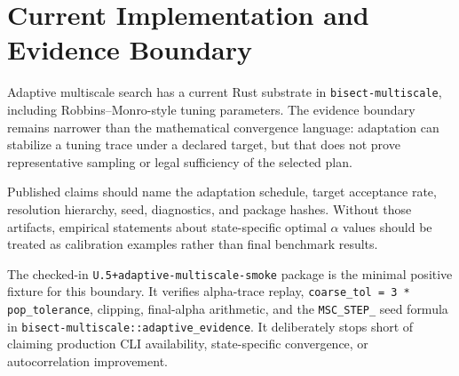 \section{Current Implementation and Evidence Boundary}

Adaptive multiscale search has a current Rust substrate in
\texttt{bisect-multiscale}, including Robbins--Monro-style tuning parameters.
The evidence boundary remains narrower than the mathematical convergence
language: adaptation can stabilize a tuning trace under a declared target, but
that does not prove representative sampling or legal sufficiency of the selected
plan.

Published claims should name the adaptation schedule, target acceptance rate,
resolution hierarchy, seed, diagnostics, and package hashes.  Without those
artifacts, empirical statements about state-specific optimal $\alpha$ values
should be treated as calibration examples rather than final benchmark results.

The checked-in \texttt{U.5+adaptive-multiscale-smoke} package is the minimal
positive fixture for this boundary.  It verifies alpha-trace replay,
\texttt{coarse\_tol = 3 * pop\_tolerance}, clipping, final-alpha arithmetic, and
the \texttt{MSC\_STEP\_} seed formula in
\texttt{bisect-multiscale::adaptive\_evidence}.  It deliberately stops short of
claiming production CLI availability, state-specific convergence, or
autocorrelation improvement.
